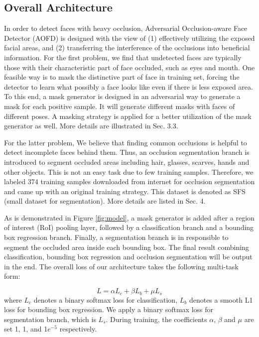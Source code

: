 \documentclass[10pt,twocolumn,letterpaper]{article}
\begin{document}
\subsection{Overall Architecture}
In order to detect faces with heavy occlusion, Adversarial Occlusion-aware Face Detector (AOFD) is designed with the view of (1) effectively utilizing the exposed facial areas, and (2) transferring the interference of the occlusions into beneficial information. For the first problem, we find that undetected faces are typically those with their characteristic part of face occluded, such as eyes and mouth. 
One feasible way is to mask the distinctive part of face in training set, forcing the detector to learn what possibly a face looks like even if there is less exposed area. To this end, a mask generator is designed in an adversarial way to generate a mask for each positive sample. It will generate different masks with faces of different poses. A masking strategy is applied for a better utilization of the mask generator as well. More details are illustrated in Sec. 3.3.

For the latter problem, We believe that finding common occlusions is helpful to detect incomplete faces behind them. Thus, an occlusion segmentation branch is introduced to segment occluded areas including hair, glasses, scarves, hands and other objects. This is not an easy task due to few training samples. Therefore, we labeled 374 training samples downloaded from internet for occlusion segmentation and came up with an original training strategy. This dataset is denoted as SFS (small dataset for segmentation). More details are listed in Sec. 4. 


As is demonstrated in Figure \ref{fig:model}, a mask generator is added after a region of interest (RoI) pooling layer, followed by a classification branch and a bounding box regression branch. Finally, a segmentation branch is in responsible to segment the occluded area inside each bounding box. The final result combining classification, bounding box regression and occlusion segmentation will be output in the end. The overall loss of our architecture takes the following multi-task form:



\begin{equation}
L = \alpha L_c + \beta L_b+ \mu L_s
\end{equation}
where $L_c$ denotes a binary softmax loss for classification, $L_b$ denotes a smooth L1 loss for bounding box regression. We apply a binary softmax loss for segmentation branch, which is $L_s$. During training, the coefficients $\alpha$, $\beta$ and $\mu$ are set 1, 1, and 1$e^{-5}$ respectively. 
\end{document}

